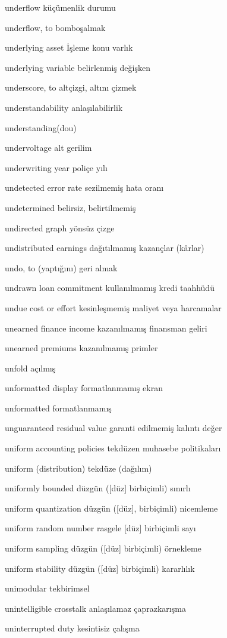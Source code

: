 \documentclass[12pt,fleqn]{article}\usepackage{../../common}
\begin{document}
underflow küçümenlik durumu

underflow, to bomboşalmak

underlying asset İşleme konu varlık

underlying variable belirlenmiş değişken

underscore, to altçizgi, altını çizmek

understandability anlaşılabilirlik

understanding(dou)

undervoltage alt gerilim

underwriting year poliçe yılı

undetected error rate sezilmemiş hata oranı

undetermined belirsiz, belirtilmemiş

undirected graph yönsüz çizge

undistributed earnings dağıtılmamış kazançlar (kârlar)

undo, to (yaptığını) geri almak

undrawn loan commitment kullanılmamış kredi taahhüdü

undue cost or effort kesinleşmemiş maliyet veya harcamalar

unearned finance income kazanılmamış finansman geliri

unearned premiums kazanılmamış primler

unfold açılmış

unformatted display formatlanmamış ekran

unformatted formatlanmamış

unguaranteed residual value garanti edilmemiş kalıntı değer

uniform accounting policies tekdüzen muhasebe politikaları

uniform (distribution) tekdüze (dağılım)

uniformly bounded düzgün ([düz] birbiçimli) sınırlı

uniform quantization düzgün ([düz], birbiçimli) nicemleme 

uniform random number rasgele [düz] birbiçimli sayı

uniform sampling düzgün ([düz] birbiçimli) örnekleme

uniform stability düzgün ([düz] birbiçimli) kararlılık

unimodular tekbirimsel

unintelligible crosstalk anlaşılamaz çaprazkarışma

uninterrupted duty kesintisiz çalışma
\end{document}
